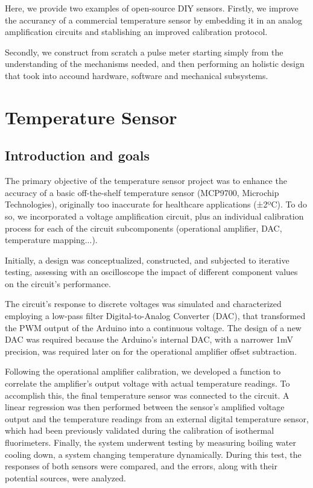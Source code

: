 \documentclass[conference]{IEEEtran}
\begin{document}
Here, we provide two examples of open-source DIY sensors. Firstly, we improve 
the accurancy of a commercial temperature sensor by embedding it in an analog amplification circuits and 
stablishing an improved calibration protocol. 

Secondly, we construct from scratch a pulse meter starting simply from the understanding of the mechanisms 
needed, and then performing an holistic design that took into accound hardware, software and mechanical subsystems.


\section{Temperature Sensor} %
   \subsection{Introduction and goals}
   The primary objective of the temperature sensor project was to enhance the 
accuracy of a basic off-the-shelf temperature sensor (MCP9700, Microchip Technologies), originally too 
inaccurate for healthcare applications (±2ºC). To do so, we 
incorporated a voltage amplification 
circuit, plus an individual calibration process for each of the 
circuit subcomponents (operational amplifier, DAC, temperature mapping...). 

Initially, a design was conceptualized, constructed, 
and subjected to iterative testing, assessing with an oscilloscope 
the impact of different component values on the circuit's performance.

The circuit's response to discrete voltages was simulated and characterized employing a low-pass filter Digital-to-Analog Converter (DAC), 
that transformed the PWM output of the Arduino into a continuous voltage. The design of a new DAC was required because the Arduino's internal DAC, 
with a narrower 1mV precision, was required later on for the operational amplifier offset subtraction.

Following the operational amplifier calibration, we developed a function to correlate the amplifier's output 
voltage with actual temperature readings. To accomplish this, the final 
temperature sensor was connected to the circuit. A linear regression was 
then performed between the sensor's amplified voltage output and the 
temperature readings from an external digital temperature sensor, which had 
been previously validated during the calibration of isothermal fluorimeters\cite{Open_qLAMPMasterOpen2023}. 
Finally, the system underwent testing by measuring boiling water cooling down, a system changing temperature dynamically. 
During this test, the responses of both sensors were compared, and the errors, along with their potential sources, were 
analyzed.
\end{document}
